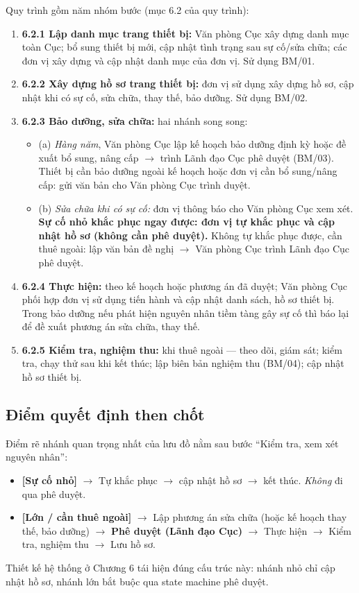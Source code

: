 Quy trình gồm năm nhóm bước (mục 6.2 của quy trình):

\begin{enumerate}
  \item \textbf{6.2.1 Lập danh mục trang thiết bị:} Văn phòng Cục xây dựng danh mục toàn Cục; bổ sung thiết bị mới, cập nhật tình trạng sau sự cố/sửa chữa; các đơn vị xây dựng và cập nhật danh mục của đơn vị. Sử dụng BM/01.
  \item \textbf{6.2.2 Xây dựng hồ sơ trang thiết bị:} đơn vị sử dụng xây dựng hồ sơ, cập nhật khi có sự cố, sửa chữa, thay thế, bảo dưỡng. Sử dụng BM/02.
  \item \textbf{6.2.3 Bảo dưỡng, sửa chữa:} hai nhánh song song:
  \begin{itemize}
    \item (a) \emph{Hàng năm}, Văn phòng Cục lập kế hoạch bảo dưỡng định kỳ hoặc đề xuất bổ sung, nâng cấp $\rightarrow$ trình Lãnh đạo Cục phê duyệt (BM/03). Thiết bị cần bảo dưỡng ngoài kế hoạch hoặc đơn vị cần bổ sung/nâng cấp: gửi văn bản cho Văn phòng Cục trình duyệt.
    \item (b) \emph{Sửa chữa khi có sự cố:} đơn vị thông báo cho Văn phòng Cục xem xét. \textbf{Sự cố nhỏ khắc phục ngay được: đơn vị tự khắc phục và cập nhật hồ sơ (không cần phê duyệt).} Không tự khắc phục được, cần thuê ngoài: lập văn bản đề nghị $\rightarrow$ Văn phòng Cục trình Lãnh đạo Cục phê duyệt.
  \end{itemize}
  \item \textbf{6.2.4 Thực hiện:} theo kế hoạch hoặc phương án đã duyệt; Văn phòng Cục phối hợp đơn vị sử dụng tiến hành và cập nhật danh sách, hồ sơ thiết bị. Trong bảo dưỡng nếu phát hiện nguyên nhân tiềm tàng gây sự cố thì báo lại để đề xuất phương án sửa chữa, thay thế.
  \item \textbf{6.2.5 Kiểm tra, nghiệm thu:} khi thuê ngoài — theo dõi, giám sát; kiểm tra, chạy thử sau khi kết thúc; lập biên bản nghiệm thu (BM/04); cập nhật hồ sơ thiết bị.
\end{enumerate}

\subsection{Điểm quyết định then chốt}

Điểm rẽ nhánh quan trọng nhất của lưu đồ nằm sau bước ``Kiểm tra, xem xét nguyên nhân'':
\begin{itemize}
  \item \textbf{[Sự cố nhỏ]} $\rightarrow$ Tự khắc phục $\rightarrow$ cập nhật hồ sơ $\rightarrow$ kết thúc. \emph{Không} đi qua phê duyệt.
  \item \textbf{[Lớn / cần thuê ngoài]} $\rightarrow$ Lập phương án sửa chữa (hoặc kế hoạch thay thế, bảo dưỡng) $\rightarrow$ \textbf{Phê duyệt (Lãnh đạo Cục)} $\rightarrow$ Thực hiện $\rightarrow$ Kiểm tra, nghiệm thu $\rightarrow$ Lưu hồ sơ.
\end{itemize}
Thiết kế hệ thống ở Chương 6 tái hiện đúng cấu trúc này: nhánh nhỏ chỉ cập nhật hồ sơ, nhánh lớn bắt buộc qua state machine phê duyệt.

